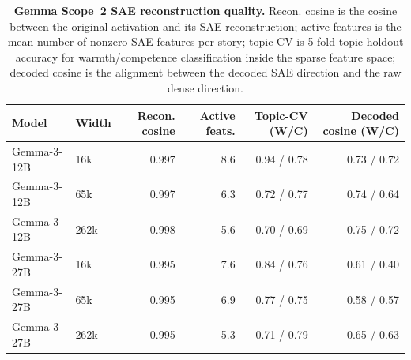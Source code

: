 \begin{table}[H]
\centering
\small
\begin{tabular}{@{}llrrrr@{}}
\toprule
Model & Width & Recon. cosine & Active feats. & Topic-CV (W/C) & Decoded cosine (W/C) \\
\midrule
Gemma-3-12B & 16k & 0.997 & 8.6 & 0.94 / 0.78 & 0.73 / 0.72 \\
Gemma-3-12B & 65k & 0.997 & 6.3 & 0.72 / 0.77 & 0.74 / 0.64 \\
Gemma-3-12B & 262k & 0.998 & 5.6 & 0.70 / 0.69 & 0.75 / 0.72 \\
Gemma-3-27B & 16k & 0.995 & 7.6 & 0.84 / 0.76 & 0.61 / 0.40 \\
Gemma-3-27B & 65k & 0.995 & 6.9 & 0.77 / 0.75 & 0.58 / 0.57 \\
Gemma-3-27B & 262k & 0.995 & 5.3 & 0.71 / 0.79 & 0.65 / 0.63 \\
\bottomrule
\end{tabular}
\caption{\textbf{Gemma Scope~2 SAE reconstruction quality.} Recon. cosine is the cosine between the original activation and its SAE reconstruction; active features is the mean number of nonzero SAE features per story; topic-CV is 5-fold topic-holdout accuracy for warmth/competence classification inside the sparse feature space; decoded cosine is the alignment between the decoded SAE direction and the raw dense direction.}
\label{tab:gemma_scope_sae_quality}
\end{table}
